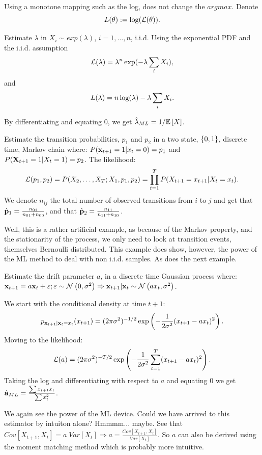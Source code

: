 Using a monotone mapping such as the log, does not change the $argmax$. 
Denote $$L(\theta):=\log(\mathcal{L}(\theta)).$$

 
\begin{example}

Estimate $\lambda$ in $X_i \sim exp(\lambda)$, $i=1,\dots,n$, i.i.d.
Using the exponential PDF and the i.i.d. assumption
$$ \mathcal{L}(\lambda) = \lambda^n \exp(-\lambda \sum_i X_i), $$
and 
$$ L(\lambda) = n \log(\lambda) -\lambda \sum_i X_i. $$

By differentiating and equating $0$, we get $\hat{\mathbf{\lambda}}_{ML}=1/\mathbb{E}\left[X\right]$.

\end{example}

\begin{example}

Estimate the transition probabilities,  $p_1$ and $p_2$ in a two state, $\left\{ 0,1 \right\}$, discrete time, Markov chain where:
$P(\mathbf{x}_{t+1}=1|x_{t}=0)=p_1$ and $P(\mathbf{X}_{t+1}=1|X_{t}=1)=p_2$.
The likelihood:
$$
  \mathcal{L}(p_1,p_2)=
  P(X_2,\dots,X_T;X_1,p_1,p_2)=
  \prod_{t=1}^T P(X_{t+1}=x_{t+1}|X_{t}=x_t).
$$
We denote $n_{ij}$ the total number of observed transitions from $i$ to $j$ and get that $\hat{\mathbf{p}}_1=\frac{n_{01}}{n_{01}+n_{00}}$, and that $\hat{\mathbf{p}}_2=\frac{n_{11}}{n_{11}+n_{10}}$.

\begin{remark}[Confession]
Well, this is a rather artificial example, as because of the Markov property, and the stationarity of the process, we only need to look at transition events, themselves Bernoulli distributed. 
This example does show, however, the power of the ML method to deal with non i.i.d. samples. As does the next example.
\end{remark}
\end{example}




\begin{example}
Estimate the drift parameter $a$,  in a discrete time Gaussian process where:
$\mathbf{x}_{t+1}=a \mathbf{x}_t+ \varepsilon; \varepsilon \sim \mathcal{N}\left(0,\sigma^2\right) \Rightarrow \mathbf{x}_{t+1}|\mathbf{x}_t \sim \mathcal{N}\left(a x_t,\sigma^2\right)$.

We start with the conditional density at time $t+1$:
$$
  p_{\mathbf{x}_{t+1}|\mathbf{x}_t=x_t}(x_{t+1}) = 
  (2 \pi \sigma^2)^{-1/2} \exp \left( 
    -\frac{1}{2 \sigma^2}(x_{t+1}-a x_t)^2 
  \right).
$$
Moving to the likelihood:
$$
  \mathcal{L}(a) = 
  (2 \pi \sigma^2)^{-T/2} \exp \left(
    -\frac{1}{2 \sigma^2}\sum_{t=1}^T (x_{t+1}-a x_t)^2 
  \right).
$$
Taking the log and differentiating with respect to $a$ and equating $0$ we get $\hat{\mathbf{a}}_{ML}=\frac{\sum x_{t+1}x_{t}}{\sum x_t^2}$.

We again see the power of the ML device.
Could we have arrived to this estimator by intuiton alone? Hmmmm... maybe. 
See that $Cov[X_{t+1},X_t] = a \; Var[X_t] \Rightarrow a=\frac{Cov[X_{t+1},X_t]}{Var[X_t]}$.
So $a$ can also be derived using the moment matching method which is probably more intuitive.

\end{example}




